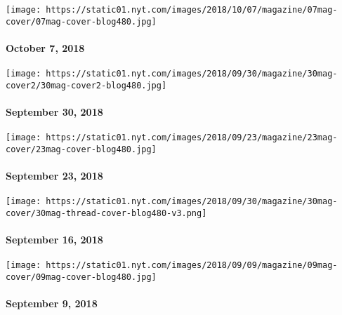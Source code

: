 \href{https://www.nytimes.com/issue/magazine/2018/10/08/the-100718-issue}{}

\texttt{[image: https://static01.nyt.com/images/2018/10/07/magazine/07mag-cover/07mag-cover-blog480.jpg]}

\hypertarget{october-7-2018}{%
\paragraph{October 7, 2018}\label{october-7-2018}}

\href{https://www.nytimes.com/issue/magazine/2018/09/28/the-93018-issue}{}

\texttt{[image: https://static01.nyt.com/images/2018/09/30/magazine/30mag-cover2/30mag-cover2-blog480.jpg]}

\hypertarget{september-30-2018}{%
\paragraph{September 30, 2018}\label{september-30-2018}}

\href{https://www.nytimes.com/interactive/2018/09/21/magazine/voyages-travel-sounds-from-the-world.html}{}

\texttt{[image: https://static01.nyt.com/images/2018/09/23/magazine/23mag-cover/23mag-cover-blog480.jpg]}

\hypertarget{september-23-2018}{%
\paragraph{September 23, 2018}\label{september-23-2018}}

\href{https://www.nytimes.com/issue/magazine/2018/09/24/the-91618-issue}{}

\texttt{[image: https://static01.nyt.com/images/2018/09/30/magazine/30mag-cover/30mag-thread-cover-blog480-v3.png]}

\hypertarget{september-16-2018}{%
\paragraph{September 16, 2018}\label{september-16-2018}}

\href{https://www.nytimes.com/issue/magazine/2018/09/06/the-9918-issue}{}

\texttt{[image: https://static01.nyt.com/images/2018/09/09/magazine/09mag-cover/09mag-cover-blog480.jpg]}

\hypertarget{september-9-2018}{%
\paragraph{September 9, 2018}\label{september-9-2018}}

